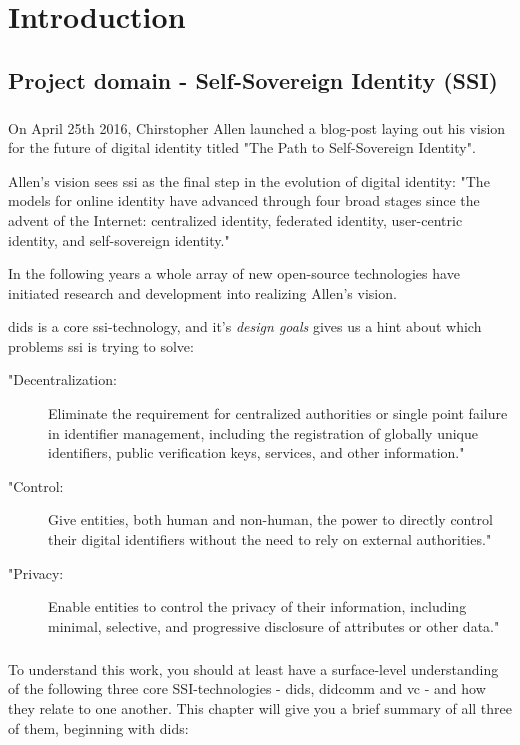 \chapter{Introduction}



\section{Project domain - Self-Sovereign Identity (SSI)}

\paragraph{}
On April 25th 2016, Chirstopher Allen launched a blog-post laying out his vision for the future of digital identity titled "The Path to Self-Sovereign Identity"\cite{ThePathToSelfSovereignIdentity}. 

Allen's vision sees \acrfull{ssi} as the final step in the evolution of digital identity: "The models for online identity have advanced through four broad stages since the advent of the Internet: centralized identity, federated identity, user-centric identity, and self-sovereign identity."\cite{ThePathToSelfSovereignIdentity}

In the following years a whole array of new open-source technologies have initiated research and development into realizing Allen's vision. 

\acrfull{dids} is a core \acrshort{ssi}-technology, and it's \textit{design goals}\cite{DIDDesignGoals} gives us a hint about which problems \acrshort{ssi} is trying to solve:
\begin{description}
    \item["Decentralization:] Eliminate the requirement for centralized authorities or single point failure in identifier management, including the registration of globally unique identifiers, public verification keys, services, and other information."
    \item["Control:] Give entities, both human and non-human, the power to directly control their digital identifiers without the need to rely on external authorities."
    \item ["Privacy:] Enable entities to control the privacy of their information, including minimal, selective, and progressive disclosure of attributes or other data."
\end{description}

\paragraph{}
To understand this work, you should at least have a surface-level understanding of the following three core SSI-technologies - \acrfull{dids}, \acrfull{didcomm} and \acrfull{vc} - and how they relate to one another. This chapter will give you a brief summary of all three of them, beginning with \acrshort{dids}:

